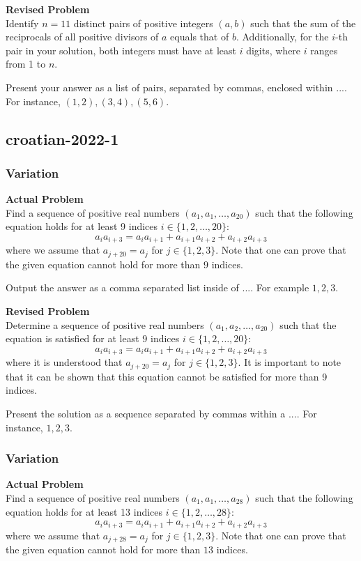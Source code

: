 \textbf{Revised Problem}\\
Identify $n = 11$ distinct pairs of positive integers $(a, b)$ such that the sum of the reciprocals of all positive divisors of $a$ equals that of $b$. Additionally, for the $i$-th pair in your solution, both integers must have at least $i$ digits, where $i$ ranges from 1 to $n$.

Present your answer as a list of pairs, separated by commas, enclosed within $\boxed{...}$. For instance, $\boxed{(1, 2), (3, 4), (5, 6)}$.

\subsection{croatian-2022-1}
\subsubsection{Variation}
\textbf{Actual Problem}\\
Find a sequence of positive real numbers $(a_1, a_1, \ldots, a_{20})$ such that the following equation holds for at least
9 indices $i \in \{ 1,2,\ldots,20 \}$: $$ a_i a_{i+3} = a_{i}a_{i+1} + a_{i+1}a_{i+2} + a_{i+2}a_{i+3}$$ where we assume that
$a_{j+20} = a_j$ for $j \in \{1,2,3\}$.
Note that one can prove that the given equation cannot hold for more than $9$ indices.


Output the answer as a comma separated list inside of $\boxed{...}$. For example $\boxed{1, 2, 3}$.

\textbf{Revised Problem}\\
Determine a sequence of positive real numbers $(a_1, a_2, \ldots, a_{20})$ such that the equation is satisfied for at least 9 indices $i \in \{ 1, 2, \ldots, 20 \}$: $$ a_i a_{i+3} = a_{i}a_{i+1} + a_{i+1}a_{i+2} + a_{i+2}a_{i+3}$$ where it is understood that $a_{j+20} = a_j$ for $j \in \{1, 2, 3\}$.
It is important to note that it can be shown that this equation cannot be satisfied for more than 9 indices.

Present the solution as a sequence separated by commas within a $\boxed{...}$. For instance, $\boxed{1, 2, 3}$.

\subsubsection{Variation}
\textbf{Actual Problem}\\
Find a sequence of positive real numbers $(a_1, a_1, \ldots, a_{28})$ such that the following equation holds for at least
13 indices $i \in \{ 1,2,\ldots,28 \}$: $$ a_i a_{i+3} = a_{i}a_{i+1} + a_{i+1}a_{i+2} + a_{i+2}a_{i+3}$$ where we assume that
$a_{j+28} = a_j$ for $j \in \{1,2,3\}$.
Note that one can prove that the given equation cannot hold for more than $13$ indices.


